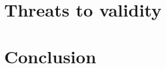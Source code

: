 \documentclass[conference]{IEEEtran}
\begin{document}
\section{Threats to validity}



\section{Conclusion}
 

\clearpage
{}

\end{document}
